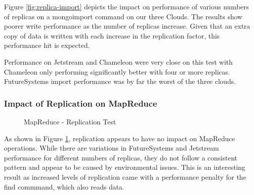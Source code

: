 \documentclass[sigconf]{acmart}
\begin{document}
Figure \ref{fig:replica-import} depicts the impact on performance of
various numbers of replicas on a mongoimport command on our three
Clouds.  The results show poorer write performance as the number of
replicas increase.  Given that an extra copy of data is written with
each increase in the replication factor, this performance hit is
expected.

Performance on Jetstream and Chameleon were very close on this test
with Chameleon only performing significantly better with four or more
replicas.  FutureSystems import performance was by far the worst of
the three clouds.


\subsubsection{Impact of Replication on MapReduce}

\begin{figure}[htbp]
\centering
{}
\caption{MapReduce - Replication Test}
\label{fig:replica-mapreduce}
\end{figure}

As shown in Figure \ref{fig:replica-mapreduce}, replication appears to
have no impact on MapReduce operations.  While there are variations in
FutureSystems and Jetstream performance for different numbers of
replicas, they do not follow a consistent pattern and appear to be
caused by environmental issues.  This is an interesting result as
increased levels of replication came with a performance penalty for
the find commmand, which also reads data.
\end{document}

